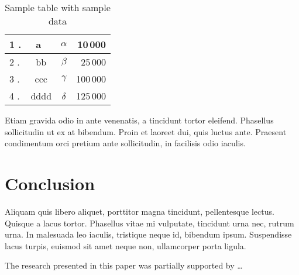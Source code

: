 \documentclass[10pt]{article}
\begin{document}
\begin{table}[!ht]
\centering
\caption{Sample table with sample data}
\label{tabl.1}
  \begin{tabular}{|l<{.}|c|>{$}c<{$}|r|}
                                 \hline
   1 & a~   & \alpha &  10\,000\\\hline
   2 & bb   & \beta  &  25\,000\\\hline
   3 & ccc  & \gamma & 100\,000\\\hline
   4 & dddd & \delta & 125\,000\\\hline
  \end{tabular}
\end{table}

Etiam gravida odio in ante venenatis, a tincidunt tortor eleifend. Phasellus sollicitudin ut ex at bibendum. Proin et laoreet dui, quis luctus ante. Praesent condimentum orci pretium ante sollicitudin, in facilisis odio iaculis.

\section{Conclusion}

Aliquam quis libero aliquet, porttitor magna tincidunt, pellentesque lectus. Quisque a lacus tortor. Phasellus vitae mi vulputate, tincidunt urna nec, rutrum urna. In malesuada leo iaculis, tristique neque id, bibendum ipsum. Suspendisse lacus turpis, euismod sit amet neque non, ullamcorper porta ligula.

\begin{acknowledgements}
 The research presented in this paper was partially supported by \ldots
\end{acknowledgements}





\end{document}
